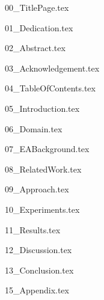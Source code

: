 \documentclass[version=last, pagesize=auto, paper=a4]{scrartcl}%
\begin{document}
{00_TitlePage.tex}

{01_Dedication.tex}

{02_Abstract.tex}

{03_Acknowledgement.tex}

{04_TableOfContents.tex}

{05_Introduction.tex}

{06_Domain.tex}

{07_EABackground.tex}

{08_RelatedWork.tex}


{09_Approach.tex}

{10_Experiments.tex}

{11_Results.tex}

{12_Discussion.tex}

{13_Conclusion.tex}


\clearpage



{15_Appendix.tex}

\end{document}
